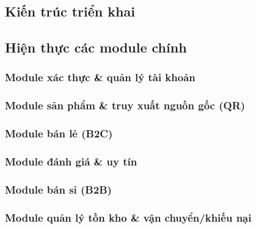 
\subsection{Kiến trúc triển khai}
\label{sec:trienkhai}

\subsection{Hiện thực các module chính}
\label{sec:hienthucmodule}

\subsubsection*{Module xác thực \& quản lý tài khoản}

\subsubsection*{Module sản phẩm \& truy xuất nguồn gốc (QR)}

\subsubsection*{Module bán lẻ (B2C)}

\subsubsection*{Module đánh giá \& uy tín}

\subsubsection*{Module bán sỉ (B2B)}

\subsubsection*{Module quản lý tồn kho \& vận chuyển/khiếu nại}

